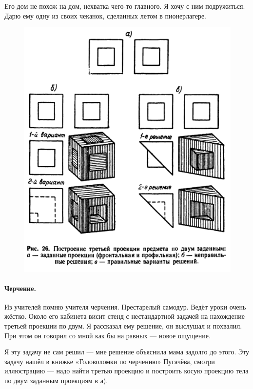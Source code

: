 \documentclass{book}
\begin{document}
Его дом не похож на дом, нехватка чего-то главного.
Я хочу с ним подружиться.
Дарю ему одну из своих чеканок,
сделанных летом в пионерлагере.

\begin{figure}[ht!]
\centering
\includegraphics[scale=.7]{pics/chercenie}
\end{figure}

\paragraph{Черчение.}
Из учителей помню учителя черчения.
Престарелый самодур.
Ведёт уроки очень жёстко.
Около его кабинета висит стенд с нестандартной 
задачей на нахождение третьей проекции по двум.
Я рассказал ему решение, он выслушал и похвалил.
При этом он говорил со мной как бы на равных --- новое ощущение.

Я эту задачу не сам решил --- мне решение объяснила мама задолго до этого.
Эту задачу нашёл в книжке «Головоломки по черчению» Пугачёва, смотри иллюстрацию --- надо найти третью проекцию и построить косую проекцию тела по двум заданным проекциям в а).
\end{document}
